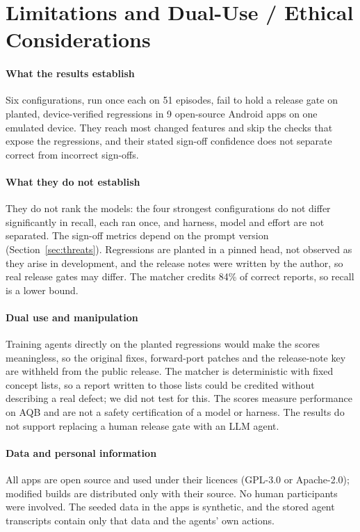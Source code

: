 \documentclass[10pt,letterpaper]{article}
\newcommand{\aqb}{AQB\xspace}
\begin{document}
{\small


}

\appendix
\section{Limitations and Dual-Use / Ethical Considerations}
\paragraph{What the results establish}
Six configurations, run once each on 51 episodes, fail to hold a release gate on planted, device-verified
regressions in 9 open-source Android apps on one emulated device. They reach most changed features and
skip the checks that expose the regressions, and their stated sign-off confidence does not separate
correct from incorrect sign-offs.

\paragraph{What they do not establish}
They do not rank the models: the four strongest configurations do not differ significantly in recall,
each ran once, and harness, model and effort are not separated. The sign-off metrics depend on the prompt
version (Section~\ref{sec:threats}). Regressions are planted in a pinned head, not
observed as they arise in development, and the release notes were written by the author, so real
release gates may differ. The matcher credits 84\% of correct reports, so recall is a lower bound.

\paragraph{Dual use and manipulation}
Training agents directly on the planted regressions would make the scores meaningless, so the original
fixes, forward-port patches and the release-note key are withheld from the public release. The matcher
is deterministic with fixed concept lists, so a report written to those lists could be credited without
describing a real defect; we did not test for this. The scores measure performance on \aqb and are not a
safety certification of a model or harness. The results do not support replacing a human release gate
with an LLM agent.

\paragraph{Data and personal information}
All apps are open source and used under their licences (GPL-3.0 or Apache-2.0); modified builds are
distributed only with their source. No human participants were involved. The seeded data in the apps is
synthetic, and the stored agent transcripts contain only that data and the agents' own actions.
\end{document}

